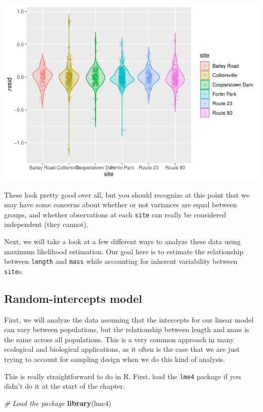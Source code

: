 \documentclass[
]{book}
\newenvironment{Shaded}{\begin{snugshade}}{\end{snugshade}}
\newcommand{\CommentTok}[1]{\textcolor[rgb]{0.56,0.35,0.01}{\textit{#1}}}
\newcommand{\KeywordTok}[1]{\textcolor[rgb]{0.13,0.29,0.53}{\textbf{#1}}}
\newcommand{\NormalTok}[1]{#1}
\begin{document}
\includegraphics{worstr_files/figure-latex/unnamed-chunk-375-1.pdf}

These look pretty good over all, but you should recognize at this point that we may have some concerns about whether or not variances are equal between groups, and whether observations at each \texttt{site} can really be considered independent (they cannot).

Next, we will take a look at a few different ways to analyze these data using maximum likelihood estimation. Our goal here is to estimate the relationship between \texttt{length} and \texttt{mass} while accounting for inherent variability between \texttt{site}s.

\hypertarget{random-intercepts-model}{%
\subsection{Random-intercepts model}\label{random-intercepts-model}}

First, we will analyze the data assuming that the intercepts for our linear model can vary between populations, but the relationship between length and mass is the same across all populations. This is a very common approach in many ecological and biological applications, as it often is the case that we are just trying to account for sampling design when we do this kind of analysis.

This is really straightforward to do in R. First, load the \texttt{lme4} package if you didn't do it at the start of the chapter.

\begin{Shaded}
\begin{Highlighting}[]
\CommentTok{# Load the package}
\KeywordTok{library}\NormalTok{(lme4)}
\end{Highlighting}
\end{Shaded}
\end{document}
